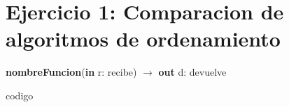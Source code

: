 \section{Ejercicio 1: Comparacion de algoritmos de ordenamiento}

\begin{algorithm}[H]
\caption{
    \textbf{nombreFuncion}(\textbf{in} r: recibe) $\to$ \textbf{out} d: devuelve
}
    \begin{algorithmic}[1]
        \State codigo
        
    \end{algorithmic}
\end{algorithm}